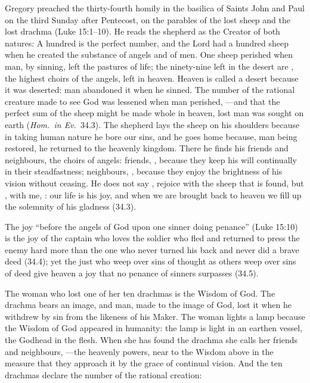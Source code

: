 Gregory preached the thirty-fourth homily in the basilica of Saints John and
Paul on the third Sunday after Pentecost, on the parables of the lost sheep
and the lost drachma (Luke 15:1--10). He reads the shepherd as the Creator
of both natures:  A hundred
is the perfect number, and the Lord had a hundred sheep when he created the
substance of angels and of men. One sheep perished when man, by sinning,
left the pastures of life; the ninety-nine left in the desert are , the highest choirs of the angels, left in heaven.
Heaven is called a desert because it was deserted: man abandoned it when he
sinned. The number of the rational creature made to see God was lessened
when man perished, ---and that the perfect sum of the sheep
might be made whole in heaven, lost man was sought on earth (\emph{Hom.\ in
Ev.}\ 34.3). The shepherd lays the sheep on his shoulders because in
taking human nature he bore our sins, and he goes home because, man being
restored, he returned to the heavenly kingdom. There he finds his friends and
neighbours, the choirs of angels: friends, , because they keep his will
continually in their steadfastness; neighbours, , because they enjoy the
brightness of his vision without ceasing. He does not say , rejoice with the
sheep that is found, but , with me, : our life is his joy, and when we are brought back
to heaven we fill up the solemnity of his gladness (34.3).

The joy ``before the angels of God upon one sinner doing penance'' (Luke
15:10) is the joy of the captain who loves the soldier who fled and returned
to press the enemy hard more than the one who never turned his back and never
did a brave deed (34.4); yet the just who weep over sins of thought as others
weep over sins of deed give heaven a joy that no penance of sinners
surpasses (34.5).

The woman who lost one of her ten drachmas is the Wisdom of God. The drachma
bears an image, and man, made to the image of God, lost it when he withdrew
by sin from the likeness of his Maker. The woman lights a lamp because the
Wisdom of God appeared in humanity: the lamp is light in an earthen vessel,
the Godhead in the flesh. When she has found the drachma she calls her
friends and neighbours, ---the heavenly powers, near to the Wisdom above in the measure
that they approach it by the grace of continual vision. And the ten drachmas
declare the number of the rational creation:

